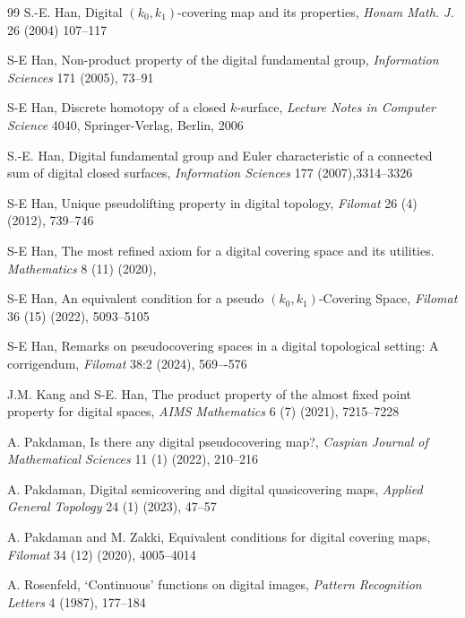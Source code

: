 \documentclass{article} \UseRawInputEncoding
\theoremstyle{plain}
\theoremstyle{definition}
\numberwithin{thm}{section}
\begin{document}
\begin{thebibliography}{99}
S.-E. Han, Digital $(k_0, k_1)$-covering map and
its properties, 
{\em Honam Math. J.} 26 (2004) 107--117

S-E Han,
Non-product property of the digital fundamental group,
{\em Information Sciences} 171 (2005), 73--91 

S-E Han,
Discrete homotopy of a closed $k$-surface,
{\em Lecture Notes in Computer Science} 4040,
Springer-Verlag, Berlin, 2006

 S.-E. Han, 
 Digital fundamental group and Euler characteristic of a connected sum of 
 digital closed surfaces, 
 {\em Information Sciences} 177 (2007),3314--3326

S-E Han,
Unique pseudolifting property in digital topology,
{\em Filomat} 26 (4) (2012), 739--746

S-E Han,
The most refined axiom for a digital covering space
and its utilities.
{\em Mathematics} 8 (11) (2020), %

S-E Han,
An equivalent condition for a pseudo
$(k_0, k_1)$-Covering Space,
{\em Filomat} 36 (15) (2022), 5093--5105

S-E Han,
Remarks on pseudocovering spaces in a digital topological setting:
A corrigendum,
{\em Filomat} 38:2 (2024), 569–-576

J.M. Kang and S-E. Han, 
The product property of the almost fixed point
property for digital spaces,
{\em AIMS Mathematics}
6 (7) (2021), 7215--7228

A. Pakdaman,
Is there any digital pseudocovering map?,
{\em Caspian Journal of Mathematical Sciences}
11 (1) (2022), 210--216

A. Pakdaman,
Digital semicovering and digital quasicovering maps,
{\em Applied General Topology}
24 (1) (2023), 47--57

A. Pakdaman and M. Zakki,
Equivalent conditions for digital covering maps,
{\em Filomat} 34 (12) (2020), 4005--4014

A. Rosenfeld,
`Continuous' functions on digital images,
{\em Pattern Recognition Letters} 4 (1987), 177--184 %

\end{thebibliography}
\end{document}
